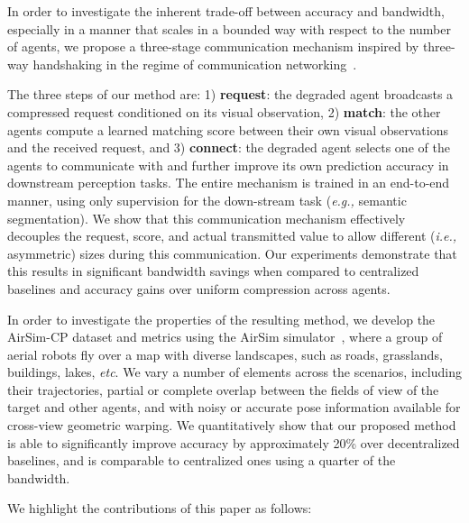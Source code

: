In order to investigate the inherent trade-off between accuracy and bandwidth, especially in a manner that scales in a bounded way with respect to the number of agents, we propose a three-stage communication mechanism inspired by three-way handshaking in the regime of communication networking~\cite{kurose2005computer}. 

The three steps of our method are: 1) \textbf{request}: the degraded agent broadcasts a compressed request conditioned on its visual observation, 2) \textbf{match}: the other agents compute a learned matching score between their own visual observations and the received request, and 3) \textbf{connect}: the degraded agent selects one of the agents to communicate with and further improve its own prediction accuracy in downstream perception tasks.
The entire mechanism is trained in an end-to-end manner, using only supervision for the down-stream task (\textit{e.g.,} semantic segmentation). We show that this communication mechanism effectively decouples the request, score, and actual transmitted value to allow different (\textit{i.e.,} asymmetric) sizes during this communication. Our experiments demonstrate that this results in significant bandwidth savings when compared to centralized baselines and accuracy gains over uniform compression across agents.

In order to investigate the properties of the resulting method, we develop the AirSim-CP dataset and metrics using the AirSim simulator~\cite{airsim2017fsr}, where a group of aerial robots fly over a map with diverse landscapes, such as roads, grasslands, buildings, lakes, \textit{etc}.
We vary a number of elements across the scenarios, including their trajectories, partial or complete overlap between the fields of view of the target and other agents, and with noisy or accurate pose information available for cross-view geometric warping. 
We quantitatively show that our proposed method is able to significantly improve accuracy by approximately 20\% over decentralized baselines, and is comparable to centralized ones using a quarter of the bandwidth. 


We highlight the contributions of this paper as follows:

